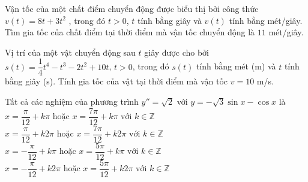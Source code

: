 \begin{ex}%
	Vận tốc  của một chất điểm chuyển động được biểu thị bởi công thức $v(t)=8t+3t^2$ , trong đó $t > 0$, $t$ tính bằng giây và $v(t)$ tính bằng mét/giây. Tìm gia tốc của chất điểm tại thời điểm mà vận tốc chuyển động là $11$ mét/giây.
\end{ex}

\begin{bt}%
	Vị trí của một vật chuyển động sau $t$ giây được cho bởi $s(t)=\dfrac{1}{4} t^4-t^3-2 t^2+10 t$, $t>0$, trong đó $s(t)$ tính bằng mét (m) và $t$ tính bằng giây (s). Tính gia tốc của vật tại thời điểm mà vận tốc $v=10$ m/s.
\end{bt}

\begin{ex}%
	Tất cả  các nghiệm của phương trình $y''=\sqrt{2}$ với $y=-\sqrt{3}\sin x-\cos x$ là
	 \choice
		{$x=\dfrac{\pi}{12}+k\pi \textrm{  hoặc }x=\dfrac{7\pi}{12}+k\pi \textrm{ với } k\in \mathbb{Z}$}
		{\True $x=\dfrac{\pi}{12}+k2\pi  \textrm{ hoặc }x=\dfrac{7\pi}{12}+k2\pi \textrm{ với } k\in \mathbb{Z}$}
		{$x=-\dfrac{\pi}{12}+k\pi  \textrm{ hoặc }x=\dfrac{5\pi}{12}+k\pi \textrm{ với } k\in \mathbb{Z}$}
		{$x=-\dfrac{\pi}{12}+k2\pi \textrm{ hoặc }x=\dfrac{5\pi}{12}+k2\pi \textrm{ với } k\in  \mathbb{Z}$}
\end{ex}

